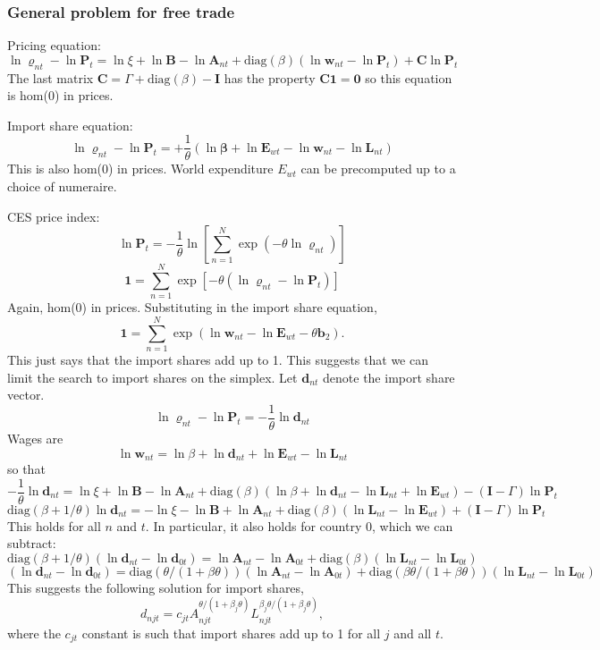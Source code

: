 \documentclass[12pt]{article}
\begin{document}
\subsubsection{General problem for free trade}
Pricing equation:
\[
\ln\mathbf \varrho_{nt}-\ln\mathbf P_{t} = 
\ln\xi
	+ \ln\mathbf B
	- \ln\mathbf A_{nt}
+\text{diag}(\beta)(\ln\mathbf w_{nt}-\ln\mathbf P_{t})
+ \mathbf C \ln\mathbf P_{t}  
\]
The last matrix $\mathbf C = \Gamma+\text{diag}(\beta)-\mathbf I$ has the property $\mathbf C\mathbf 1=\mathbf 0$ so this equation is hom(0) in prices. 

Import share equation:
\[
\ln\mathbf \varrho_{nt} - \ln\mathbf P_{t} 
 = 
 	+\frac1\theta(\ln\mathbf\beta+\ln \mathbf E_{wt}-\ln \mathbf w_{nt}- \ln \mathbf L_{nt})
\]
This is also hom(0) in prices. World expenditure $E_{wt}$ can be precomputed up to a choice of numeraire.

CES price index:
\[
\ln\mathbf P_{t} = -\frac1\theta
 \ln \left[
 	\sum_{n=1}^N \exp(-\theta \ln \varrho_{nt})
 \right]
\]
\[
\mathbf 1 =  
 	\sum_{n=1}^N \exp[-\theta (\ln \varrho_{nt}-\ln\mathbf P_{t})]
\]
Again, hom(0) in prices. Substituting in the import share equation,
\[
\mathbf 1 =  
 	\sum_{n=1}^N \exp(\ln\mathbf w_{nt}-\ln\mathbf E_{wt}-\theta\mathbf b_2).
\]
This just says that the import shares add up to 1. This suggests that we can limit the search to import shares on the simplex. Let $\mathbf d_{nt}$ denote the import share vector.
\[
\ln\mathbf \varrho_{nt} - \ln\mathbf P_{t} 
 = -\frac1\theta \ln\mathbf d_{nt}
\]
Wages are
\[
\ln\mathbf w_{nt} = \ln\beta+\ln\mathbf d_{nt}+\ln\mathbf E_{wt}-\ln\mathbf L_{nt}
\]
so that
\[
-\frac1\theta \ln\mathbf d_{nt} = 
\ln\xi
	+ \ln\mathbf B
	- \ln\mathbf A_{nt}
+
\text{diag}(\beta)(\ln\beta+\ln\mathbf d_{nt}-\ln\mathbf L_{nt}+\ln\mathbf E_{wt})
- (\mathbf I-\Gamma) \ln\mathbf P_{t}  
\]
\[
\text{diag}(\beta+1/\theta) \ln\mathbf d_{nt} = 
-\ln\xi
	- \ln\mathbf B
	+ \ln\mathbf A_{nt}
+
\text{diag}(\beta)(\ln\mathbf L_{nt}-\ln\mathbf E_{wt})
+ (\mathbf I-\Gamma) \ln\mathbf P_{t}  
\]
This holds for all $n$ and $t$. In particular, it also holds for country $0$, which we can subtract:
\[
\text{diag}(\beta+1/\theta) (\ln\mathbf d_{nt}-\ln\mathbf d_{0t}) = 
	\ln\mathbf A_{nt}-\ln\mathbf A_{0t}
+
\text{diag}(\beta)(\ln\mathbf L_{nt}-\ln\mathbf L_{0t})
\]
\[
(\ln\mathbf d_{nt}-\ln\mathbf d_{0t}) = 
	\text{diag}(\theta/(1+\beta\theta)) (\ln\mathbf A_{nt}-\ln\mathbf A_{0t})
+
\text{diag}(\beta\theta/(1+\beta\theta))(\ln\mathbf L_{nt}-\ln\mathbf L_{0t})
\]
This suggests the following solution for import shares,
\[
d_{njt} = c_{jt}A_{njt}^{\theta/(1+\beta_j\theta)}L_{njt}^{\beta_j\theta/(1+\beta_j\theta)},
\]
where the $c_{jt}$ constant is such that import shares add up to 1 for all $j$ and all $t$.
\end{document}
